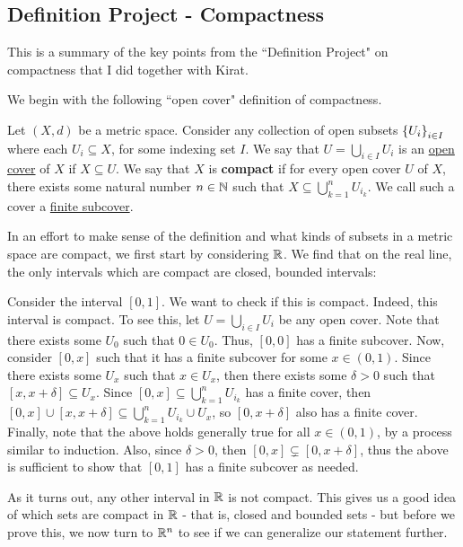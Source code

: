 \subsection{Definition Project - Compactness}

This is a summary of the key points from the ``Definition Project" on compactness that I did
together with Kirat.

We begin with the following ``open cover" definition of compactness.

\begin{defn}
    Let $ (X, d) $ be a metric space. \vsp
    Consider any collection of open subsets $ \left\{{U_{i}}\right\}_{i \in I} $ where each
    $ U_{i} \subseteq X $, for some indexing set $ I $.
    We say that $ U = \bigcup_{i \in I} U_{i} $ is an \underline{open cover} of $ X $ if
    $ X \subseteq U $. \vsp
    We say that $ X $ is \textbf{compact} if for every open cover $ U $ of $ X $, there exists some
    natural number $ n \in \mathbb{N} $ such that $ X \subseteq \bigcup_{k=1}^{n} U_{i_{k}} $.
    We call such a cover a \underline{finite subcover}.
\end{defn}

In an effort to make sense of the definition and what kinds of subsets in a metric space are
compact, we first start by considering $ \mathbb{R} $. We find that on the real line, the only
intervals which are compact are closed, bounded intervals:
\begin{xmp}
    Consider the interval $ [0, 1] $. We want to check if this is compact. \vsp
    Indeed, this interval is compact.
    To see this, let $ U = \bigcup_{i \in I} U_{i} $ be any open cover.
    Note that there exists some $ U_{0} $ such that $ 0 \in U_{0} $.
    Thus, $ [0, 0] $ has a finite subcover. \vsp
    Now, consider $ [0, x] $ such that it has a finite subcover for some $ x \in (0, 1) $.
    Since there exists some $ U_{x} $ such that $ x \in U_{x} $, then there exists some
    $ \delta > 0 $ such that $ [x, x + \delta] \subseteq U_{x} $.
    Since $ [0, x] \subseteq \bigcup_{k=1}^{n} U_{i_{k}} $ has a finite cover, then
    $ [0, x] \cup [x, x + \delta] \subseteq \bigcup_{k=1}^{n} U_{i_{k}} \cup U_{x} $,
    so $ [0, x + \delta] $ also has a finite cover. \vsp
    Finally, note that the above holds generally true for all $ x \in (0, 1) $, by a process
    similar to induction.
    Also, since $ \delta > 0 $, then $ [0, x] \subsetneq [0, x + \delta] $, thus the above
    is sufficient to show that $ [0, 1] $ has a finite subcover as needed.
\end{xmp}
As it turns out, any other interval in $ \mathbb{R} $ is not compact.
This gives us a good idea of which sets are compact in $ \mathbb{R} $ - that is, closed and bounded
sets - but before we prove this, we now turn to $ \mathbb{R}^{n} $ to see if we can generalize our
statement further.

